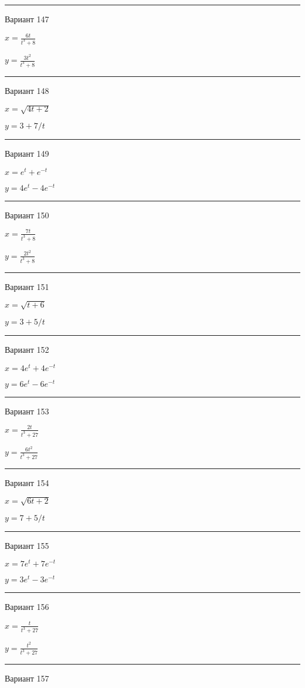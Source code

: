 \documentclass[11pt]{report}
\begin{document}
\rule{\textwidth}{.2mm}

 Вариант 147

$x = \frac{6 t}{t^{3} + 8}$

$y = \frac{3 t^{2}}{t^{3} + 8}$

\rule{\textwidth}{.2mm}

 Вариант 148

$x = \sqrt{4 t + 2}$

$y = 3 + 7 / t$

\rule{\textwidth}{.2mm}

 Вариант 149

$x = e^{t} + e^{- t}$

$y = 4 e^{t} - 4 e^{- t}$

\rule{\textwidth}{.2mm}

 Вариант 150

$x = \frac{7 t}{t^{3} + 8}$

$y = \frac{2 t^{2}}{t^{3} + 8}$

\rule{\textwidth}{.2mm}

 Вариант 151

$x = \sqrt{t + 6}$

$y = 3 + 5 / t$

\rule{\textwidth}{.2mm}

 Вариант 152

$x = 4 e^{t} + 4 e^{- t}$

$y = 6 e^{t} - 6 e^{- t}$

\rule{\textwidth}{.2mm}

 Вариант 153

$x = \frac{2 t}{t^{3} + 27}$

$y = \frac{6 t^{2}}{t^{3} + 27}$

\rule{\textwidth}{.2mm}

 Вариант 154

$x = \sqrt{6 t + 2}$

$y = 7 + 5 / t$

\rule{\textwidth}{.2mm}

 Вариант 155

$x = 7 e^{t} + 7 e^{- t}$

$y = 3 e^{t} - 3 e^{- t}$

\rule{\textwidth}{.2mm}

 Вариант 156

$x = \frac{t}{t^{3} + 27}$

$y = \frac{t^{2}}{t^{3} + 27}$

\rule{\textwidth}{.2mm}

 Вариант 157
\end{document}
